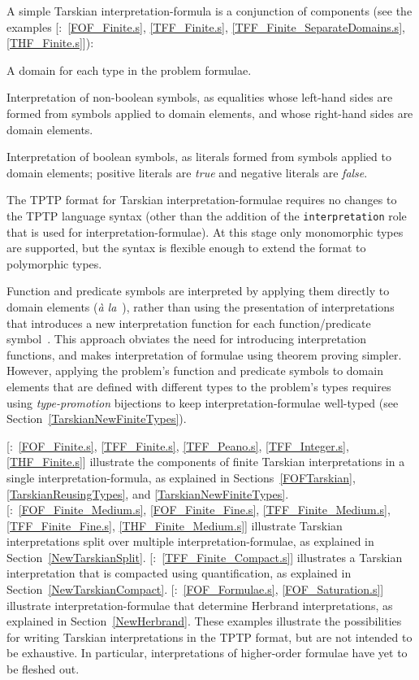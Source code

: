 \documentclass{ceurart}
\newcommand{\smalltt}[1]{\small \texttt{#1}}
\newcommand{\example}{{\scriptsize \faFile[regular]}}
\newenvironment{packed_itemize}{
\vspace*{-0.3em}
\begin{itemize}
\setlength{\partopsep}{0pt}
\setlength{\itemsep}{1pt}
\setlength{\parskip}{0pt}
\setlength{\parsep}{0pt}
}{\end{itemize}}
\begin{document}
A simple Tarskian interpretation-formula is a conjunction of components
(see the examples [\example{}:~\ref{FOF_Finite.s}, \ref{TFF_Finite.s}, 
\ref{TFF_Finite_SeparateDomains.s}, \ref{THF_Finite.s}]):
\begin{packed_itemize}
\item A domain for each type in the problem formulae.
\item Interpretation of non-boolean symbols, as equalities whose left-hand sides are formed from 
      symbols applied to domain elements, and whose right-hand sides are domain elements.
\item Interpretation of boolean symbols, as literals formed from symbols applied to domain 
      elements; positive literals are \emph{true} and negative literals are \emph{false}.
\end{packed_itemize}
The TPTP format for Tarskian interpretation-formulae requires no changes to the TPTP
language syntax (other than the addition of the \smalltt{interpretation} role that is used for
interpretation-formulae).
At this stage only monomorphic types are supported, but the syntax is flexible enough to extend
the format to polymorphic types.

Function and predicate symbols are interpreted by applying them directly to domain elements 
(\emph{{\`a} la}~\cite[\S5.3.4]{Gal15}), rather than using the presentation of interpretations that 
introduces a new interpretation function for each function/predicate symbol~\cite[\S5.3.2]{Gal15}.
This approach obviates the need for introducing interpretation functions, and makes 
interpretation of formulae using theorem proving simpler.
However, applying the problem's function and predicate symbols to domain elements that are 
defined with different types to the problem's types requires using \emph{type-promotion} 
bijections to keep interpretation-formulae well-typed (see Section~\ref{TarskianNewFiniteTypes}).

[\example{}:~\ref{FOF_Finite.s}, \ref{TFF_Finite.s}, \ref{TFF_Peano.s}, \ref{TFF_Integer.s}, 
\ref{THF_Finite.s}] illustrate the components of finite Tarskian interpretations in a single 
interpretation-formula, as explained in Sections~\ref{FOFTarskian}, \ref{TarskianReusingTypes}, 
and \ref{TarskianNewFiniteTypes}.
[\example{}:~\ref{FOF_Finite_Medium.s}, \ref{FOF_Finite_Fine.s}, \ref{TFF_Finite_Medium.s}, 
\ref{TFF_Finite_Fine.s}, \ref{THF_Finite_Medium.s}] illustrate Tarskian interpretations split 
over multiple interpretation-formulae, as explained in Section~\ref{NewTarskianSplit}.
[\example{}:~\ref{TFF_Finite_Compact.s}] illustrates a Tarskian interpretation that is compacted 
using quantification, as explained in Section~\ref{NewTarskianCompact}.
[\example{}:~\ref{FOF_Formulae.s}, \ref{FOF_Saturation.s}] illustrate interpretation-formulae 
that determine Herbrand interpretations, as explained in Section~\ref{NewHerbrand}.
These examples illustrate the possibilities for writing Tarskian interpretations in the TPTP 
format, but are not intended to be exhaustive.
In particular, interpretations of higher-order formulae have yet to be fleshed out.
\end{document}

